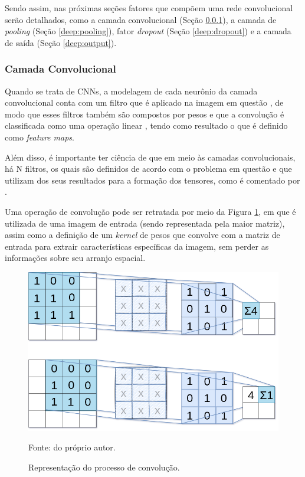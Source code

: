 Sendo assim, nas próximas seções fatores que compõem uma rede convolucional serão detalhados, como a camada convolucional (Seção \ref{deep:conv}), a camada de \textit{pooling} (Seção \ref{deep:pooling}), fator \textit{dropout} (Seção \ref{deep:dropout}) e a camada de saída (Seção \ref{deep:output}).


\subsubsection{Camada Convolucional}
\label{deep:conv}

Quando se trata de CNNs, a modelagem de cada neurônio da camada convolucional conta com um filtro que é aplicado na imagem em questão \cite{ponti2018funciona}, de modo que esses filtros também são compostos por pesos e que a convolução é classificada como uma operação linear \cite{Goodfellow2016}, tendo como resultado o que é definido como \textit{feature maps}.

Além disso, é importante ter ciência de que em meio às camadas convolucionais, há N filtros, os quais são definidos de acordo com o problema em questão e que utilizam dos seus resultados para a formação dos tensores, como é comentado por \cite{ponti2018funciona}.

Uma operação de convolução pode ser retratada por meio da Figura \ref{deep:fig:6}, em que é  utilizada de uma imagem de entrada (sendo representada pela maior matriz), assim como a definição de um \textit{kernel} de pesos que convolve com a matriz de entrada para extrair características específicas da imagem, sem perder as informações sobre seu arranjo espacial.

\begin{figure}[H]
    \centering
    \caption{Representação do processo de convolução.}
    \includegraphics[width=1\linewidth]{recursos/imagens/deep/2d_convolution.png}
    \label{deep:fig:6}
    
    \vspace*{1 cm}
    Fonte: do próprio autor.
\end{figure}


